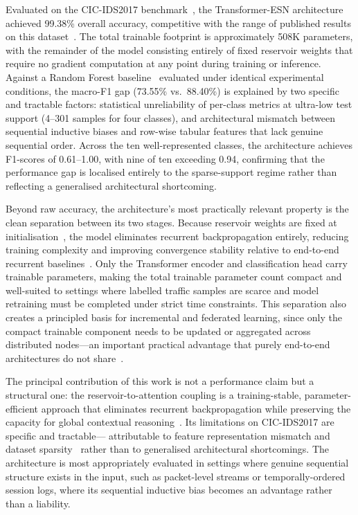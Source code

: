 \documentclass[5p,times]{elsarticle}
\begin{document}
	Evaluated on the CIC-IDS2017 benchmark~\cite{cicids2017},
	the Transformer-ESN architecture achieved 99.38\% overall
	accuracy, competitive with the range of published results on this
	dataset~\cite{kurniabudi2020,xgb2023,svmelm2018,grurnn2018,
		cnnlstm2024,cnnbigru2022,rtids2022,trbma2025}. The total
	trainable footprint is approximately 508K parameters, with the
	remainder of the model consisting entirely of fixed reservoir
	weights that require no gradient computation at any point during
	training or inference. Against a Random Forest baseline~\cite{kurniabudi2020}
	evaluated under identical experimental conditions, the macro-F1 gap
	(73.55\% vs.\ 88.40\%) is explained by two specific and tractable
	factors: statistical unreliability of per-class metrics at
	ultra-low test support (4--301 samples for four classes), and
	architectural mismatch between sequential inductive biases and
	row-wise tabular features that lack genuine sequential order.
	Across the ten well-represented classes, the architecture achieves
	F1-scores of 0.61--1.00, with nine of ten exceeding 0.94, confirming
	that the performance gap is localised entirely to the sparse-support
	regime rather than reflecting a generalised architectural shortcoming.
	
	Beyond raw accuracy, the architecture's most practically relevant
	property is the clean separation between its two stages. Because
	reservoir weights are fixed at initialisation~\cite{jaeger2001,
		scardapane2017}, the model eliminates recurrent backpropagation
	entirely, reducing training complexity and improving convergence
	stability relative to end-to-end recurrent
	baselines~\cite{grurnn2018,yin2017deep}. Only the Transformer
	encoder and classification head carry trainable parameters,
	making the total trainable parameter count compact and
	well-suited to settings where labelled traffic samples are
	scarce and model retraining must be completed under strict time
	constraints. This separation also creates a principled basis for
	incremental and federated learning, since only the compact
	trainable component needs to be updated or aggregated across
	distributed nodes---an important practical advantage that
	purely end-to-end architectures do not share~\cite{buczak2016survey,
		khraisat2019survey}.
	
	The principal contribution of this work is not a performance
	claim but a structural one: the reservoir-to-attention coupling
	is a training-stable, parameter-efficient approach that
	eliminates recurrent backpropagation while preserving the
	capacity for global contextual
	reasoning~\cite{gallicchio2017,vaswani2017attention}. Its
	limitations on CIC-IDS2017 are specific and tractable---
	attributable to feature representation mismatch and dataset
	sparsity~\cite{ring2019survey,thakkar2020} rather than to
	generalised architectural shortcomings. The architecture is most
	appropriately evaluated in settings where genuine sequential
	structure exists in the input, such as packet-level streams or
	temporally-ordered session logs, where its sequential inductive
	bias becomes an advantage rather than a liability.
	
\end{document}
